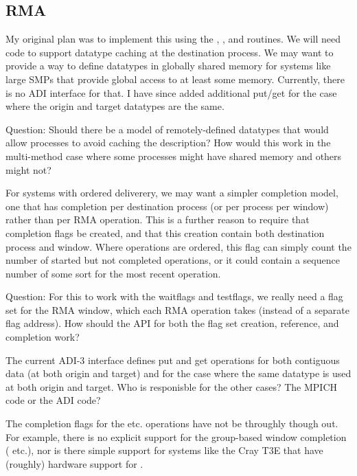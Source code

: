 \documentclass{article}
\begin{document}
\subsection{RMA}

My original plan was to implement this using the ,
,  and  routines.  We
will need code to support datatype caching at the destination process.
We may want to provide a way to define datatypes in globally shared
memory for systems like large SMPs that provide global access to at
least some memory.  Currently, there is no ADI interface for that.
I have since added additional put/get for the case where the origin
and target datatypes are the same.  

Question:  Should there be a model of remotely-defined datatypes that
would allow processes to avoid caching the description?  How would
this work in the multi-method case where some processes might have
shared memory and others might not?

For systems with ordered deliverery, we may want a simpler completion
model, one that has completion per destination process (or per process
per window) rather than per RMA operation.  This is a further reason
to require that completion flags be created, and that this creation
contain both destination process and window.  Where operations are
ordered, this flag can simply count the number of started but not
completed operations, or it could contain a sequence number of some
sort for the most recent operation.  

Question:  For this to work with the waitflags and testflags, we
really need a flag set for the RMA window, which each RMA operation
takes (instead of a separate flag address).  How should the API for
both the flag set creation, reference, and completion work?  

The current ADI-3 interface defines put and get operations for both
contiguous data (at both origin and target) and for the case where the
same datatype is used at both origin and target.  Who is responisble
for the other cases?  The MPICH code or the ADI code?

The completion flags for the  etc. operations
have not be throughly though out.  For example, there is no explicit
support for the group-based window completion (
etc.), nor is there simple support for systems like the Cray T3E that
have (roughly) hardware support for .

\subsubsection{}
\end{document}
